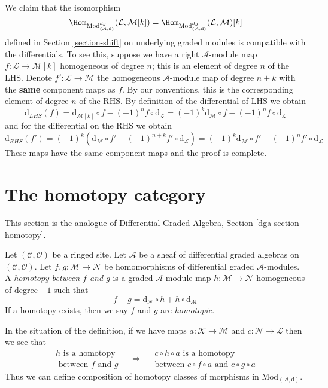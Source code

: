 \medskip\noindent
We claim that the isomorphism
$$
\Hom_{\text{Mod}^{dg}_{(\mathcal{A}, \text{d})}}(\mathcal{L}, \mathcal{M}[k])
=
\Hom_{\text{Mod}^{dg}_{(\mathcal{A}, \text{d})}}(\mathcal{L}, \mathcal{M})[k]
$$
defined in Section \ref{section-shift} on underlying graded modules
is compatible with
the differentials. To see this, suppose we have a right $\mathcal{A}$-module
map $f : \mathcal{L} \to \mathcal{M}[k]$ homogeneous of degree $n$; this
is an element of degree $n$ of the LHS. Denote
$f' : \mathcal{L} \to \mathcal{M}$ the homogeneous $\mathcal{A}$-module
map of degree $n + k$ with the {\bf same} component maps as $f$.
By our conventions, this is the corresponding element of degree $n$
of the RHS.
By definition of the differential of LHS we obtain
$$
\text{d}_{LHS}(f) =
\text{d}_{\mathcal{M}[k]} \circ f - (-1)^n f \circ \text{d}_\mathcal{L} =
(-1)^k\text{d}_\mathcal{M} \circ f - (-1)^n f \circ \text{d}_\mathcal{L}
$$
and for the differential on the RHS we obtain
$$
\text{d}_{RHS}(f') =
(-1)^k\left(
\text{d}_\mathcal{M} \circ f' - (-1)^{n + k} f' \circ \text{d}_\mathcal{L}
\right) =
(-1)^k\text{d}_\mathcal{M} \circ f' - (-1)^n f' \circ \text{d}_\mathcal{L}
$$
These maps have the same component maps and the proof is complete.










\section{The homotopy category}
\label{section-homotopy}

\noindent
This section is the analogue of
Differential Graded Algebra, Section \ref{dga-section-homotopy}.

\begin{definition}
\label{definition-homotopy}
Let $(\mathcal{C}, \mathcal{O})$ be a ringed site.
Let $\mathcal{A}$ be a sheaf of differential graded algebras
on $(\mathcal{C}, \mathcal{O})$. Let
$f, g : \mathcal{M} \to \mathcal{N}$
be homomorphisms of differential graded $\mathcal{A}$-modules.
A {\it homotopy between $f$ and $g$} is a graded $\mathcal{A}$-module
map $h : \mathcal{M} \to \mathcal{N}$ homogeneous of degree $-1$
such that
$$
f - g = \text{d}_\mathcal{N} \circ h + h \circ \text{d}_\mathcal{M}
$$
If a homotopy exists, then we say $f$ and $g$ are {\it homotopic}.
\end{definition}

\noindent
In the situation of the definition, if we have maps
$a : \mathcal{K} \to \mathcal{M}$ and $c : \mathcal{N} \to \mathcal{L}$
then we see that
$$
\begin{matrix}
h\text{ is a homotopy} \\
\text{ between }f\text{ and } g
\end{matrix}
\quad
\Rightarrow
\quad
\begin{matrix}
c \circ h \circ a\text{ is a homotopy}\\
\text{between }
c \circ f \circ a\text{ and } c\circ g \circ a
\end{matrix}
$$
Thus we can define composition of homotopy classes of morphisms
in $\text{Mod}_{(\mathcal{A}, \text{d})}$.

